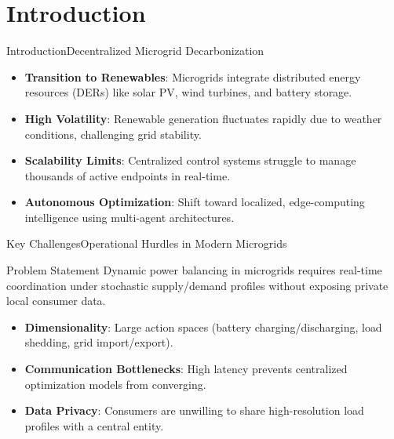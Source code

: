 \section{Introduction}

\begin{frame}{Introduction}{Decentralized Microgrid Decarbonization}
  \begin{itemize}[<+->]
    \item \textbf{Transition to Renewables}: Microgrids integrate distributed energy resources (DERs) like solar PV, wind turbines, and battery storage.
    \item \textbf{High Volatility}: Renewable generation fluctuates rapidly due to weather conditions, challenging grid stability.
    \item \textbf{Scalability Limits}: Centralized control systems struggle to manage thousands of active endpoints in real-time.
    \item \textbf{Autonomous Optimization}: Shift toward localized, edge-computing intelligence using multi-agent architectures.
  \end{itemize}
\end{frame}

\begin{frame}{Key Challenges}{Operational Hurdles in Modern Microgrids}
  \begin{alertblock}{Problem Statement}
    Dynamic power balancing in microgrids requires real-time coordination under stochastic supply/demand profiles without exposing private local consumer data.
  \end{alertblock}
  \vspace{0.3cm}
  \begin{itemize}
    \item \textbf{Dimensionality}: Large action spaces (battery charging/discharging, load shedding, grid import/export).
    \item \textbf{Communication Bottlenecks}: High latency prevents centralized optimization models from converging.
    \item \textbf{Data Privacy}: Consumers are unwilling to share high-resolution load profiles with a central entity.
  \end{itemize}
\end{frame}
